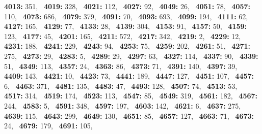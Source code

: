 \textbf{4013:} 351,\allowbreak~ 
\textbf{4019:} 328,\allowbreak~ 
\textbf{4021:} 112,\allowbreak~ 
\textbf{4027:} 92,\allowbreak~ 
\textbf{4049:} 26,\allowbreak~ 
\textbf{4051:} 78,\allowbreak~ 
\textbf{4057:} 110,\allowbreak~ 
\textbf{4073:} 686,\allowbreak~ 
\textbf{4079:} 379,\allowbreak~ 
\textbf{4091:} 70,\allowbreak~ 
\textbf{4093:} 693,\allowbreak~ 
\textbf{4099:} 194,\allowbreak~ 
\textbf{4111:} 62,\allowbreak~ 
\textbf{4127:} 165,\allowbreak~ 
\textbf{4129:} 77,\allowbreak~ 
\textbf{4133:} 28,\allowbreak~ 
\textbf{4139:} 304,\allowbreak~ 
\textbf{4153:} 91,\allowbreak~ 
\textbf{4157:} 50,\allowbreak~ 
\textbf{4159:} 123,\allowbreak~ 
\textbf{4177:} 45,\allowbreak~ 
\textbf{4201:} 165,\allowbreak~ 
\textbf{4211:} 572,\allowbreak~ 
\textbf{4217:} 342,\allowbreak~ 
\textbf{4219:} 2,\allowbreak~ 
\textbf{4229:} 12,\allowbreak~ 
\textbf{4231:} 188,\allowbreak~ 
\textbf{4241:} 229,\allowbreak~ 
\textbf{4243:} 94,\allowbreak~ 
\textbf{4253:} 75,\allowbreak~ 
\textbf{4259:} 202,\allowbreak~ 
\textbf{4261:} 51,\allowbreak~ 
\textbf{4271:} 275,\allowbreak~ 
\textbf{4273:} 29,\allowbreak~ 
\textbf{4283:} 5,\allowbreak~ 
\textbf{4289:} 29,\allowbreak~ 
\textbf{4297:} 63,\allowbreak~ 
\textbf{4327:} 114,\allowbreak~ 
\textbf{4337:} 90,\allowbreak~ 
\textbf{4339:} 51,\allowbreak~ 
\textbf{4349:} 113,\allowbreak~ 
\textbf{4357:} 24,\allowbreak~ 
\textbf{4363:} 86,\allowbreak~ 
\textbf{4373:} 71,\allowbreak~ 
\textbf{4391:} 140,\allowbreak~ 
\textbf{4397:} 39,\allowbreak~ 
\textbf{4409:} 143,\allowbreak~ 
\textbf{4421:} 10,\allowbreak~ 
\textbf{4423:} 73,\allowbreak~ 
\textbf{4441:} 189,\allowbreak~ 
\textbf{4447:} 127,\allowbreak~ 
\textbf{4451:} 107,\allowbreak~ 
\textbf{4457:} 6,\allowbreak~ 
\textbf{4463:} 371,\allowbreak~ 
\textbf{4481:} 135,\allowbreak~ 
\textbf{4483:} 47,\allowbreak~ 
\textbf{4493:} 128,\allowbreak~ 
\textbf{4507:} 74,\allowbreak~ 
\textbf{4513:} 53,\allowbreak~ 
\textbf{4517:} 314,\allowbreak~ 
\textbf{4519:} 174,\allowbreak~ 
\textbf{4523:} 113,\allowbreak~ 
\textbf{4547:} 85,\allowbreak~ 
\textbf{4549:} 319,\allowbreak~ 
\textbf{4561:} 182,\allowbreak~ 
\textbf{4567:} 244,\allowbreak~ 
\textbf{4583:} 5,\allowbreak~ 
\textbf{4591:} 348,\allowbreak~ 
\textbf{4597:} 197,\allowbreak~ 
\textbf{4603:} 142,\allowbreak~ 
\textbf{4621:} 6,\allowbreak~ 
\textbf{4637:} 275,\allowbreak~ 
\textbf{4639:} 115,\allowbreak~ 
\textbf{4643:} 299,\allowbreak~ 
\textbf{4649:} 130,\allowbreak~ 
\textbf{4651:} 85,\allowbreak~ 
\textbf{4657:} 127,\allowbreak~ 
\textbf{4663:} 71,\allowbreak~ 
\textbf{4673:} 24,\allowbreak~ 
\textbf{4679:} 179,\allowbreak~ 
\textbf{4691:} 105,\allowbreak~ 
